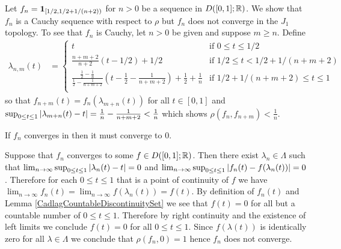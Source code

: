 \begin{examp}\label{NoncompletenessSkorohod}Let $f_n =
  \textbf{1}_{[1/2, 1/2 + 1/(n+2))}$ for $n >0$ be a sequence in
  $D([0,1];\mathbb{R})$.  We show that $f_n$ is a Cauchy sequence with
  respect to $\rho$ but $f_n$ does not converge in the $J_1$ topology.
To see that $f_n$ is Cauchy, let $n > 0$ be given and suppose $m \geq
n$.  Define 
\begin{align*}
\lambda_{n,m}(t) &= \begin{cases}
t & \text{if $0 \leq t \leq 1/2$} \\
\frac{n+m+2}{n+2}(t - 1/2) + 1/2 & \text{if $1/2 \leq t < 1/2 +
  1/(n+m+2)$} \\
\frac{\frac{1}{2} - \frac{1}{n}}{\frac{1}{2} - \frac{1}{n+m+2}}(t - \frac{1}{2} - \frac{1}{n+m+2}) + \frac{1}{2} + \frac{1}{n} & \text{if $1/2 +
  1/(n+m+2) \leq t \leq 1$} \\
\end{cases}
\end{align*}
so that $f_{n+m} (t) = f_{n}(\lambda_{m+n}(t))$ for all $t \in [0,1]$
and $\sup_{0 \leq t \leq 1} \left \vert \lambda_{m+n}(t) - t \right \vert = \frac{1}{n} -
\frac{1}{n+m+2} < \frac{1}{n}$ which shows $\rho(f_n, f_{n+m}) < \frac{1}{n}$.

\begin{clm}If $f_n$ converges in then it must converge to $0$.
\end{clm}

Suppose that $f_n$ converges to some $f \in D([0,1];\mathbb{R})$.  Then
there exist $\lambda_n \in \Lambda$ such that $\lim_{n \to \infty} \sup_{0 \leq t \leq 1}
\left \vert \lambda_n(t) - t \right \vert = 0$ and 
$\lim_{n \to \infty} \sup_{0 \leq t \leq 1}\left \vert f_n(t) -
  f(\lambda_n(t)) \right \vert = 0$.  Therefore for each $0 \leq t \leq 1$ that is
a point of continuity of $f$ we have 
$\lim_{n \to \infty} f_n(t) = \lim_{n \to \infty} f(\lambda_n(t)) =
f(t)$.  By definition of $f_n(t)$ and Lemma
\ref{CadlagCountableDiscontinuitySet} we see that $f(t) = 0$ for all
but a countable number of $0 \leq t \leq 1$.  Therefore by right
continuity and the existence of left limits we conclude $f(t) = 0$ for
all $0 \leq t \leq 1$.  Since $f(\lambda(t))$ is identically zero for
all $\lambda \in \Lambda$ we conclude that $\rho(f_n, 0) = 1$ hence
$f_n$ does not converge.
\end{examp}

